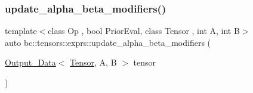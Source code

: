 \subsubsection{\texorpdfstring{update\+\_\+alpha\+\_\+beta\+\_\+modifiers()}{update\_alpha\_beta\_modifiers()}}
{\footnotesize\ttfamily template$<$class Op , bool Prior\+Eval, class Tensor , int A, int B$>$ \\
auto bc\+::tensors\+::exprs\+::update\+\_\+alpha\+\_\+beta\+\_\+modifiers (\begin{DoxyParamCaption}\item[{\hyperlink{structbc_1_1tensors_1_1exprs_1_1Output__Data}{Output\+\_\+\+Data}$<$ \hyperlink{namespacebc_a659391e47ab612be3ba6c18cf9c89159}{Tensor}, A, B $>$}]{tensor }\end{DoxyParamCaption})\hspace{0.3cm}{\ttfamily [inline]}}

